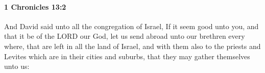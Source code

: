 
		\paragraph{1 Chronicles 13:2} %
			\label{1CHRONICLES-13-2}

			And David said unto all the congregation of Israel, If it seem good unto you, and that it be of the LORD our God, let us send abroad unto our brethren every where, that are left in all the land of Israel, and with them also to the priests and Levites which are in their cities and suburbs, that they may gather themselves unto us:


